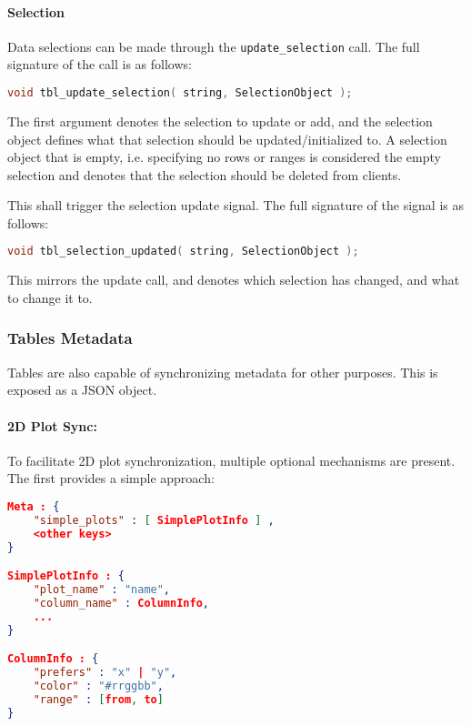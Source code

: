\documentclass[11pt, oneside]{amsart}
\begin{document}
\paragraph{\textbf{Selection}} Data selections can be made through the \texttt{update\_selection} call. The full signature of the call is as follows:

\begin{lstlisting}[language=c++]
	void tbl_update_selection( string, SelectionObject );
\end{lstlisting}

The first argument denotes the selection to update or add, and the selection object defines what that selection should be updated/initialized to. A selection object that is empty, i.e. specifying no rows or ranges is considered the empty selection and denotes that the selection should be deleted from clients.

This shall trigger the selection update signal. The full signature of the signal is as follows:

\begin{lstlisting}[language=c++]
	void tbl_selection_updated( string, SelectionObject );
\end{lstlisting}

This mirrors the update call, and denotes which selection has changed, and what to change it to.

\subsubsection{Tables Metadata}

Tables are also capable of synchronizing metadata for other purposes. This is exposed as a JSON object.

\paragraph{2D Plot Sync:} To facilitate 2D plot synchronization, multiple optional mechanisms are present. The first provides a simple approach:

\begin{lstlisting}[language=json, label=listing:simple_sync_meta, caption=Table Metadata for Plot Sync ]
Meta : {
	"simple_plots" : [ SimplePlotInfo ] ,
	<other keys>
}

SimplePlotInfo : {
	"plot_name" : "name",
	"column_name" : ColumnInfo,
	...
}

ColumnInfo : {
	"prefers" : "x" | "y",
	"color" : "#rrggbb",
	"range" : [from, to]
}
\end{lstlisting}
\end{document}
